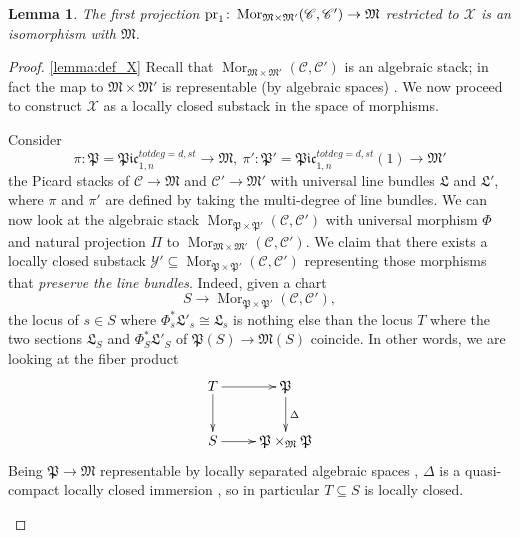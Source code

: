 \documentclass[11pt]{amsart}
\renewcommand{\to}{\rightarrow}
\newcommand{\pr}{\rm{pr}}
\newcommand{\cC}{\mathcal C}
\theoremstyle{plain}
\newtheorem{lem}[thm]{Lemma}
\theoremstyle{definition}
\begin{document}
\begin{lem}\label{lamma:projection_iso}
 The first projection $\pr_1\colon \operatorname{Mor}_{\mathfrak{M}\times\mathfrak{M}'}(\mathcal C,\mathcal C')\to\mathfrak M$ restricted to $\mathcal X$ is an isomorphism with $\mathfrak M$.
\end{lem}

\begin{proof}\ref{lemma:def_X}
Recall that $\operatorname{Mor}_{\mathfrak{M}\times\mathfrak{M}'}(\mathcal C,\mathcal C')$ is an algebraic stack; in fact the map to $\mathfrak{M}\times\mathfrak{M}'$ is representable (by algebraic spaces) \cite{OlssonHOM}. We now proceed to construct $\mathcal X$ as a locally closed substack in the space of morphisms.

\begin{description}[labelindent=0cm,leftmargin=\parindent]

\item[Step 1] Consider
 \[\pi\colon\mathfrak{P}=\mathfrak{Pic}^{tot deg=d,st}_{1,n}\to\mathfrak{M},\ \pi'\colon\mathfrak{P}'=\mathfrak{Pic}^{tot deg=d,st}_{1,n}(1)\to\mathfrak{M}'\]
  the Picard stacks of $\cC\to\mathfrak{M}$ and $\cC'\to\mathfrak{M'}$ with universal line bundles $\mathfrak{L}$ and $\mathfrak{L'}$, where $\pi$ and $\pi'$ are defined by taking the multi-degree of line bundles. We can now look at the algebraic stack $\operatorname{Mor}_{\mathfrak{P}\times\mathfrak{P}'}(\mathcal C,\mathcal C')$ with universal morphism
 $\Phi$ and natural projection $\Pi$ to $\operatorname{Mor}_{\mathfrak{M}\times\mathfrak{M}'}(\mathcal C,\mathcal C')$. We claim that there exists a locally closed substack $\mathcal{Y'}\subseteq \operatorname{Mor}_{\mathfrak{P}\times\mathfrak{P}'}(\mathcal C,\mathcal C')$ representing those morphisms that \emph{preserve the line bundles}. Indeed, given a chart 
 \begin{equation*}%
 S\to\operatorname{Mor}_{\mathfrak{P}\times\mathfrak{P}'}(\mathcal C,\mathcal C'),
  \end{equation*} 
   the locus of $s\in S$ where $\Phi_s^*\mathfrak{L}'_s\cong\mathfrak{L}_s$ is nothing else than the locus $T$ where the two sections $\mathfrak{L}_S$ and $\Phi_S^*\mathfrak{L}'_S$ of $\mathfrak{P}(S)\to\mathfrak{M}(S)$ coincide. In other words, we are looking at the fiber product 
  \[\xymatrix{T\ar[r]\ar[d]&\mathfrak{P}\ar[d]^{\Delta}\\
  S\ar[r]&\mathfrak{P}\times_{\mathfrak{M}}\mathfrak{P}}\]
Being $\mathfrak{P}\to\mathfrak{M}$ representable by locally separated algebraic spaces \cite[Theorem~8.3.1]{neron}, $\Delta$ is a quasi-compact locally closed immersion \cite[\href{http://stacks.math.columbia.edu/tag/04YU}{Tag 04YU}]{stacks-project}, so in particular $T\subseteq S$ is locally closed.


\end{description}
\end{proof}
\end{document}
